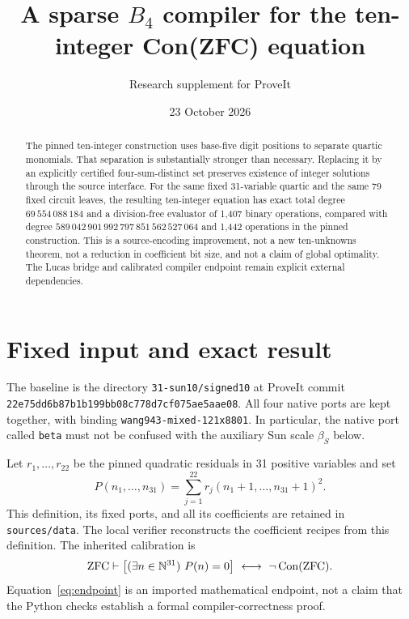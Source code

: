 \documentclass[11pt]{article}
\title{A sparse $B_4$ compiler for the ten-integer\texorpdfstring{ Con(ZFC)}{ Con(ZFC)} equation}
\author{Research supplement for ProveIt}
\date{23 October 2026}
\begin{document}
\maketitle
\begin{abstract}
The pinned ten-integer construction uses base-five digit positions to
separate quartic monomials. That separation is substantially stronger than
necessary. Replacing it by an explicitly certified four-sum-distinct set
preserves existence of integer solutions through the source interface. For the same
fixed 31-variable quartic and the same 79 fixed circuit leaves, the resulting
ten-integer equation has exact total degree $69\,554\,088\,184$ and a
division-free evaluator of 1,407 binary operations, compared with degree
$589\,042\,901\,992\,797\,851\,562\,527\,064$ and 1,442 operations in the
pinned construction. This is a source-encoding improvement, not a new
ten-unknowns theorem, not a reduction in coefficient bit size, and not a
claim of global optimality. The Lucas bridge and calibrated compiler
endpoint remain explicit external dependencies.
\end{abstract}

\section{Fixed input and exact result}
The baseline is the directory \texttt{31-sun10/signed10} at ProveIt commit\\
\texttt{22e75dd6b87b1b199bb08c778d7cf075ae5aae08}.
All four native ports are
kept together, with binding \texttt{wang943-mixed-121x8801}. In particular,
the native port called \texttt{beta} must not be confused with the auxiliary
Sun scale $\beta_S$ below.

Let $r_1,\ldots,r_{22}$ be the pinned quadratic residuals in 31 positive
variables and set
\[
 P(n_1,\ldots,n_{31})=\sum_{j=1}^{22}r_j(n_1+1,\ldots,n_{31}+1)^2.
\]
This definition, its fixed ports, and all its coefficients are retained in
\texttt{sources/data}. The local verifier reconstructs the coefficient
recipes from this definition. The inherited calibration is
\begin{equation}\label{eq:endpoint}
 \mathrm{ZFC}\vdash
 \bigl[(\exists n\in\mathbb N^{31})\ P(n)=0\bigr]
 \ \longleftrightarrow\ \neg\operatorname{Con}(\mathrm{ZFC}).
\end{equation}
Equation~\eqref{eq:endpoint} is an imported mathematical endpoint, not a
claim that the Python checks establish a formal compiler-correctness proof.
\end{document}
